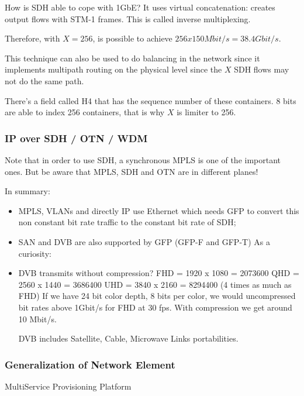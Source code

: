 How is SDH able to cope with 1GbE?
It uses virtual concatenation: creates  output flows with STM-1 frames. 
This is called inverse multiplexing.


Therefore, with $X = 256$, is possible to achieve $256 x 150 Mbit/s = 38.4 Gbit/s$.


This technique can also be used to do balancing in the network since it implements multipath routing on the physical level since the $X$ SDH flows may not do the same path.

There's a field called H4 that has the sequence number of these containers.
8 bits are able to index 256 containers, that is why $X$ is limiter to 256.



\subsubsection*{IP over SDH / OTN / WDM}

Note that in order to use SDH, a synchronous 
MPLS is one of the important ones. But be aware that MPLS, SDH and OTN are in different planes!



In summary:
\begin{itemize}
    \item MPLS,  VLANs and directly IP use Ethernet which needs GFP to convert this non constant bit rate traffic to the constant bit rate of SDH; 
    \item SAN and DVB are also supported by GFP (GFP-F and GFP-T)
    As a curiosity:
    \item DVB transmits without compression?
    FHD = 1920 x 1080 = 2073600
    QHD = 2560 x 1440 = 3686400
    UHD = 3840 x 2160 = 8294400 (4 times as much as FHD)
    If we have 24 bit color depth, 8 bits per color, we would uncompressed bit rates above 1Gbit/s for FHD at 30 fps. With compression we get around 10 Mbit/s.


    DVB includes Satellite, Cable, Microwave Links portabilities.
\end{itemize}





\subsubsection*{Generalization of Network Element}

MultiService Provisioning Platform







